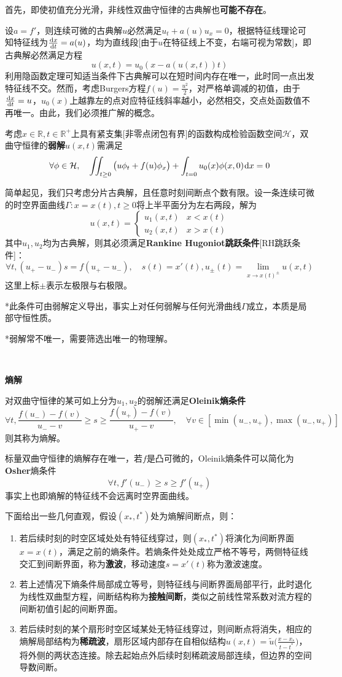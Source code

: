 \documentclass[a4paper,UTF8,fontset=windows]{ctexart}
\newcommand*{\dr}{\hspace{0.07em}\mathrm{d}}
\begin{document}
首先，即使初值充分光滑，非线性双曲守恒律的古典解也\textbf{可能不存在}。

设$a=f'$，则连续可微的古典解$u$必然满足$u_t+a(u)u_x=0$，根据特征线理论可知特征线为$\frac{\dr x}{\dr t}=a(u)$，均为直线段[由于$u$在特征线上不变，右端可视为常数]，即古典解必然满足方程
$$u(x,t)=u_0(x-a(u(x,t))t)$$
利用隐函数定理可知适当条件下古典解可以在短时间内存在唯一，此时同一点出发特征线不交。然而，考虑Burgers方程$f(u)=\frac{u^2}{2}$，对严格单调减的初值，由于$\frac{\dr x}{\dr t}=u$，$u_0(x)$上越靠左的点对应特征线斜率越小，必然相交，交点处函数值不再唯一。由此，我们必须推广解的概念。

考虑$x\in\mathbb{R},t\in\mathbb{R}^+$上具有紧支集[非零点闭包有界]的函数构成检验函数空间$\mathcal{H}$，双曲守恒律的\textbf{弱解}$u(x,t)$需满足
$$\forall\phi\in\mathcal{H},\quad\iint_{t\ge0}\big(u\phi_t+f(u)\phi_x\big)+\int_{t=0}u_0(x)\phi(x,0)\dr x=0$$

简单起见，我们只考虑分片古典解，且任意时刻间断点个数有限。设一条连续可微的时空界面曲线$\Gamma:x=x(t),t\ge0$将上半平面分为左右两段，解为
$$u(x,t)=\begin{cases}u_1(x,t)&x<x(t)\\u_2(x,t)&x>x(t)\end{cases}$$
其中$u_1,u_2$均为古典解，则其必须满足\textbf{Rankine Hugoniot跳跃条件}[RH跳跃条件]：
$$\forall t,(u_+-u_-)s=f(u_+-u_-),\quad s(t)=x'(t),u_\pm(t)=\lim_{x\to x(t)^\pm}u(x,t)$$
这里上标$\pm$表示左极限与右极限。

*此条件可由弱解定义导出，事实上对任何弱解与任何光滑曲线$\Gamma$成立，本质是局部守恒性质。

*弱解常不唯一，需要筛选出唯一的物理解。

\

\textbf{熵解}

对双曲守恒律的某可如上分为$u_1,u_2$的弱解还满足\textbf{Oleinik熵条件}
$$\forall t,\frac{f(u_-)-f(v)}{u_--v}\ge s\ge\frac{f(u_+)-f(v)}{u_+-v},\quad\forall v\in[\min(u_-,u_+),\max(u_-,u_+)]$$
则其称为熵解。

标量双曲守恒律的熵解存在唯一，若$f$是凸可微的，Oleinik熵条件可以简化为\textbf{Osher}熵条件
$$\forall t,f'(u_-)\ge s\ge f'(u_+)$$
事实上也即熵解的特征线不会远离时空界面曲线。

下面给出一些几何直观，假设$(x_*,t^*)$处为熵解间断点，则：
\begin{enumerate}
    \item 若后续时刻的时空区域处处有特征线穿过，则$(x_*,t^*)$将演化为间断界面$x=x(t)$，满足之前的熵条件。若熵条件处处成立严格不等号，两侧特征线交汇到间断界面，称为\textbf{激波}，移动速度$s=x'(t)$称为激波速度。
    \item 若上述情况下熵条件局部成立等号，则特征线与间断界面局部平行，此时退化为线性双曲型方程，间断结构称为\textbf{接触间断}，类似之前线性常系数对流方程的间断初值引起的间断界面。
    \item  若后续时刻的某个扇形时空区域某处无特征线穿过，则间断点将消失，相应的熵解局部结构为\textbf{稀疏波}，扇形区域内部存在自相似结构$u(x,t)=\tilde{u}\big(\frac{x-x_*}{t-t^*}\big)$，将外侧的两状态连接。除去起始点外后续时刻稀疏波局部连续，但边界的空间导数间断。
\end{enumerate}
\end{document}
